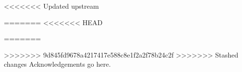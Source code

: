 <<<<<<< Updated upstream

=======
<<<<<<< HEAD

=======

>>>>>>> 9d845fd9678a4217417e588c8e1f2a2f78b24c2f
>>>>>>> Stashed changes
Acknowledgements go here.
